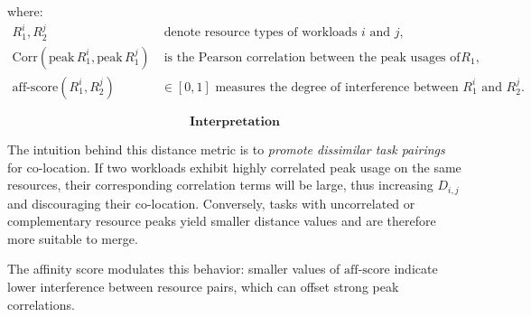 \begin{enumerate}
          where:
          \begin{align}
              R_1^i, R_2^j & \; \text{denote resource types of workloads } i \text{ and } j,                           \\[4pt]
              \mathrm{Corr}(\mathrm{peak}\,R_1^i, \mathrm{peak}\,R_1^j)
                           & \; \text{is the Pearson correlation between the peak usages of resource } R_1,            \\[4pt]
              \mathrm{aff\text{-}score}(R_1^i, R_2^j)
                           & \in [0, 1] \text{ measures the degree of interference between } R_1^i \text{ and } R_2^j.
          \end{align}

          \[
              \textbf{Interpretation}
          \]

          The intuition behind this distance metric is to
          \emph{promote dissimilar task pairings} for co-location.
          If two workloads exhibit highly correlated peak usage on the same resources,
          their corresponding correlation terms will be large,
          thus increasing \( D_{i,j} \) and discouraging their co-location.
          Conversely, tasks with uncorrelated or complementary resource peaks
          yield smaller distance values and are therefore more suitable to merge.

          The affinity score modulates this behavior:
          smaller values of \( \mathrm{aff\text{-}score} \)
          indicate lower interference between resource pairs,
          which can offset strong peak correlations.


\end{enumerate}
